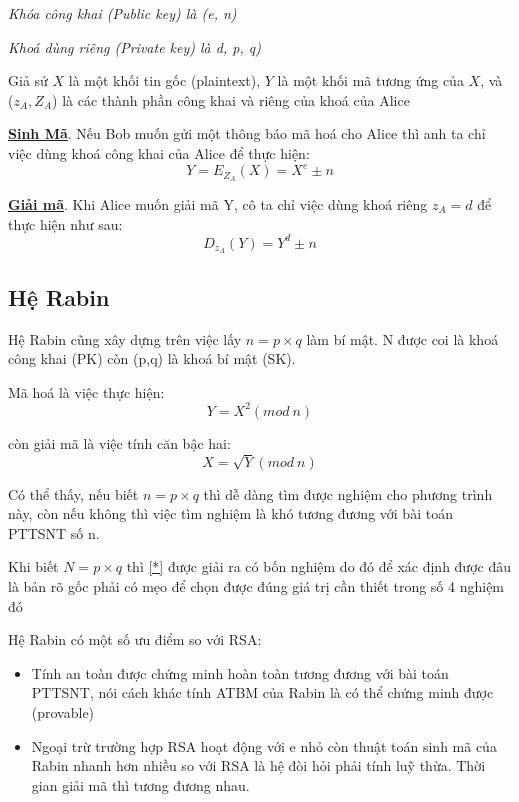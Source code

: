 \documentclass[a4paper,12pt]{report}
\begin{document}
\textit{Khóa công khai (Public key) là (e, n)}

\textit{Khoá dùng riêng (Private key) là d, p, q)}

Giả sử $X$ là một khối tin gốc (plaintext), $Y$ là một khối mã tương ứng của $X$, và ($z_A, Z_A$) là các thành phần công khai và riêng của khoá của Alice

\textbf{\underline{Sinh Mã}}. Nếu Bob muốn gửi một thông báo mã hoá cho Alice thì anh ta chỉ việc dùng khoá công khai của Alice để thực hiện:
\begin{displaymath}
Y = E_{Z_A}(X) = X^e \pm n
\end{displaymath}

\textbf{\underline{Giải mã}}. Khi Alice muốn giải mã Y, cô ta chỉ việc dùng khoá riêng $z_A = d$ để thực hiện như sau:
\begin{displaymath}
D_{z_A}(Y) = Y^d \pm n
\end{displaymath}
\subsection*{Hệ Rabin}
Hệ Rabin cũng xây dựng trên việc lấy $n=p\times q$ làm bí mật. N được coi là khoá công khai (PK) còn (p,q) là khoá bí mật (SK).

Mã hoá là việc thực hiện:
\begin{displaymath}
Y = X^2 (mod \ n)
\end{displaymath}

còn giải mã là việc tính căn bậc hai:
\begin{equation}
X = \sqrt{Y} (mod \ n)  \label{*} 
\end{equation}

Có thể thấy, nếu biết $n=p\times q$ thì dễ dàng tìm được nghiệm cho phương trình này, còn nếu không thì việc tìm nghiệm là khó tương đương với bài toán PTTSNT số n.

Khi biết $N=p\times q$ thì \ref{*} được giải ra có bốn nghiệm do đó để xác định được đâu là bản rõ gốc phải có mẹo để chọn được đúng giá trị cần thiết trong số 4 nghiệm đó

Hệ Rabin có một số ưu điểm so với RSA:
\begin{itemize}
\item Tính an toàn được chứng minh hoàn toàn tương đương với bài toán PTTSNT, nói cách khác tính ATBM của Rabin là có thể chứng minh  được (provable)
\item Ngoại trừ trường hợp RSA hoạt động với e nhỏ còn thuật toán sinh mã của Rabin nhanh hơn nhiều so với RSA là hệ đòi hỏi phải tính luỹ thừa. Thời gian giải mã thì
tương đương nhau.
\end{itemize}
\end{document}
